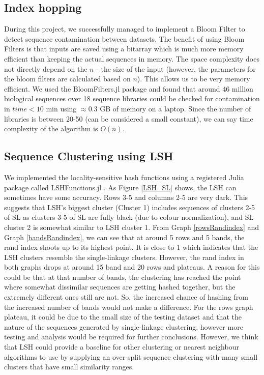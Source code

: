 \documentclass[times, twoside, watermark]{zHenriquesLab-StyleBioRxiv}
\begin{document}
\subsection*{Index hopping}
During this project, we successfully managed to implement a Bloom Filter to detect sequence contamination between datasets. The benefit of using Bloom Filters is that inputs are saved using a bitarray which is much more memory efficient than keeping the actual sequences in memory. The space complexity does not directly depend on the $n$ - the size of the input (however, the parameters for the bloom filters are calculated based on $n$). This allows us to be very memory efficient. We used the BloomFilters.jl package and found that around 46 million biological sequences over 18 sequence libraries could be checked for contamination in $time < 10$ min using $\approx 0.3$ GB of memory on a laptop. Since the number of libraries is between 20-50 (can be considered a small constant), we can say time complexity of the algorithm is $O(n)$. %

\subsection*{Sequence Clustering using LSH}
We implemented the locality-sensitive hash functions using a registered Julia package called LSHFunctions.jl \cite{LSHFunctions}. As Figure \ref{LSH_SL} shows, the LSH can sometimes have some accuracy. Rows 3-5 and columns 2-5 are very dark. This suggests that LSH's biggest cluster (Cluster 1) includes sequences of clusters 2-5 of SL as clusters 3-5 of SL are fully black (due to colour normalization), and SL cluster 2 is somewhat similar to LSH cluster 1. From Graph \ref{rowsRandindex} and Graph \ref{bandsRandindex}, we can see that at around 5 rows and 5 bands, the rand index shoots up to its highest point. It is close to 1 which indicates that the LSH clusters resemble the single-linkage clusters. However, the rand index in both graphs drops at around 15 band and 20 rows and plateaus. A reason for this could be that at that number of bands, the clustering has reached the point where somewhat dissimilar sequences are getting hashed together, but the extremely different ones still are not. So, the increased chance of hashing from the increased number of bands would not make a difference. For the rows graph plateau, it could be due to the small size of the testing dataset and that the nature of the sequences generated by single-linkage clustering, however more testing and analysis would be required for further conclusions. However, we think that LSH could provide a baseline for other clustering or nearest neighbour algorithms to use by supplying an over-split sequence clustering with many small clusters that have small similarity ranges. \\
\end{document}
